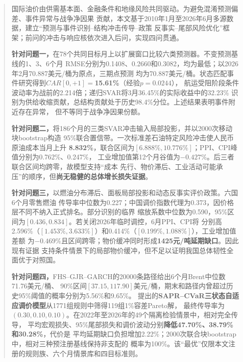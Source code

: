 \begin{abstract}
国际油价由供需基本面、金融条件和地缘风险共同驱动。为避免混淆预测偏差、事件异常与战争净因果
贡献，本文基于2010年1月至2026年6月多源数据，建立“预测与事件识别--结构冲击传导--政策
反事实--尾部风险优化”框架；前问的冲击与响应核依次进入后问，实现四问贯通。

\textbf{针对问题一，}在78个共同目标月上以扩展窗口比较六类预测器。不变预测基线的1、3、6个月
RMSE分别为0.1408、0.2660和0.3082，均为最低；以2026年2月70.887美元/桶为原点，三期点预测
均为70.887美元/桶。状态匹配事件研究得到$CAR[0,+1]=$\textbf{15.61\%}（经验$p=0.0244$），
航运受阻阶段条件波动率为战前的2.214倍；递归SVAR将3月36.45\%的实际收益中的32.23\%
识别为供给收缩贡献，总结构贡献处于历史98.4\%分位。上述结果表明事件附近存在异常，
但不等同于战争净因果份额。

\textbf{针对问题二，}将186个月的三类SVAR冲击输入局部投影，并以2000次移动块bootstrap构造
95\%联合置信带。一次标准差石油特定风险冲击使人民币原油成本当月上升
\textbf{8.832\%}，联合区间为$[6.888\%,10.776\%]$；PPI、CPI峰值分别为0.762\%、0.247\%，
工业增加值第12个月谷值为$-0.427\%$。后三者联合区间均跨零，故模型支持“成本
先行、物价滞后、工业活动可能承压”的顺序，但\textbf{尚无稳健的总体增长损失证据}。

\textbf{针对问题三，}以燃油分布滞后、面板局部投影和动态反事实评价政策。六国6个月零售燃油
传导率中位数为0.227；中国调价指数代理为0.373，因价格层不同不纳入正式排名。部分识别的临界
缩放系数中位数为0.590，95\%区间为$[0.436,0.834]$。若关闭2026年临时调控，6月PPI、CPI将
分别高2.596\%（$[1.453\%,3.633\%]$）和0.414\%（$[0.199\%,1.088\%]$），工业增加值差额
为$-0.469\%$且区间跨零；物价缓冲同时形成\textbf{1425元/吨延期缺口}。因此现有证据
支持条件情景下的局部物价缓冲，但不足以证明我国总体韧性全面优于对照国。

\textbf{针对问题四，}FHS--GJR--GARCH的20000条路径给出6个月Brent中位数71.76美元/桶、
90\%区间$[37.15,117.90]$美元/桶，期末和路径内曾超过历史95\%阈值的概率分别为5.56\%和9.65\%。
提出的\textbf{SAPR--CVaR三状态自适应调价模型}从1771组规则中筛得119组1\%容差Pareto解，
最终传导率为$(0.30,0.10,0.10)$。在2022年至2026年的49个隔离检验情景中，相对完全传导，
平均宏观损失、95\%尾部损失和调价波动分别\textbf{降低47.70\%、38.79\%和30.28\%}，代价是
平均延期缺口负担增加2.22\%；2000次联合块bootstrap中，相对三种预注册基线保持非支配的
概率为100\%。该“最优”仅限本文注册的规则族、六个月情景库和四目标准则。

\end{abstract}
